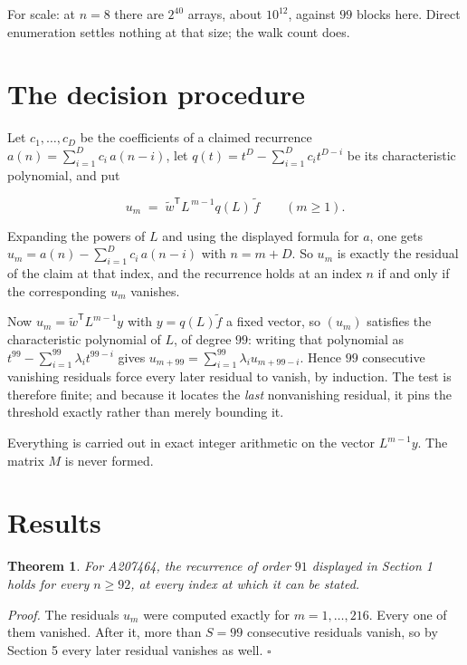\documentclass[11pt]{article}
\newtheorem{theorem}{Theorem}
\theoremstyle{definition}
\begin{document}
For scale: at $n = 8$ there are $2^{40}$ arrays, about $10^{12}$, against $99$ blocks here. Direct enumeration settles nothing at that size; the walk count does.

\section{The decision procedure}

Let $c_1,\dots,c_D$ be the coefficients of a claimed recurrence $a(n) = \sum_{i=1}^{D} c_i\,a(n-i)$, let $q(t) = t^{D} - \sum_{i=1}^{D} c_i t^{D-i}$ be its characteristic polynomial, and put

\[u_m \;=\; \tilde w^{\mathsf T} L^{\,m-1} q(L)\,\tilde f \qquad (m \ge 1).\]

Expanding the powers of $L$ and using the displayed formula for $a$, one gets $u_m = a(n) - \sum_{i=1}^{D} c_i\,a(n-i)$ with $n = m + D$. So $u_m$ is exactly the residual of the claim at that index, and the recurrence holds at an index $n$ if and only if the corresponding $u_m$ vanishes.

Now $u_m = \tilde w^{\mathsf T} L^{m-1} y$ with $y = q(L)\tilde f$ a fixed vector, so $(u_m)$ satisfies the characteristic polynomial of $L$, of degree $99$: writing that polynomial as $t^{99} - \sum_{i=1}^{99} \lambda_i t^{99-i}$ gives $u_{m+99} = \sum_{i=1}^{99} \lambda_i u_{m+99-i}$. Hence $99$ consecutive vanishing residuals force every later residual to vanish, by induction. The test is therefore finite; and because it locates the {\itshape last} nonvanishing residual, it pins the threshold exactly rather than merely bounding it.

Everything is carried out in exact integer arithmetic on the vector $L^{m-1}y$. The matrix $M$ is never formed.

\section{Results}

\begin{theorem} For A207464, the recurrence of order $91$ displayed in Section 1 holds for every $n \ge 92$, at every index at which it can be stated.\end{theorem}

{\itshape Proof.} The residuals $u_m$ were computed exactly for $m = 1,\dots,216$. Every one of them vanished. After it, more than $S = 99$ consecutive residuals vanish, so by Section 5 every later residual vanishes as well. $\square$
\end{document}
